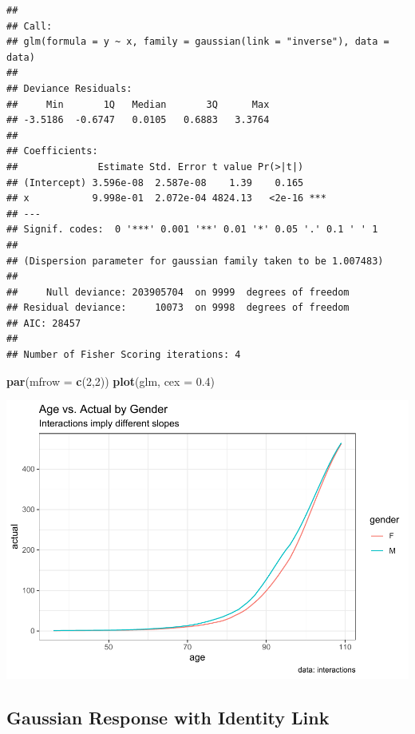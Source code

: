 \documentclass[openany]{book}
\newenvironment{Shaded}{\begin{snugshade}}{\end{snugshade}}
\newcommand{\DataTypeTok}[1]{\textcolor[rgb]{0.13,0.29,0.53}{#1}}
\newcommand{\DecValTok}[1]{\textcolor[rgb]{0.00,0.00,0.81}{#1}}
\newcommand{\FloatTok}[1]{\textcolor[rgb]{0.00,0.00,0.81}{#1}}
\newcommand{\KeywordTok}[1]{\textcolor[rgb]{0.13,0.29,0.53}{\textbf{#1}}}
\newcommand{\NormalTok}[1]{#1}
\begin{document}
\begin{verbatim}
## 
## Call:
## glm(formula = y ~ x, family = gaussian(link = "inverse"), data = data)
## 
## Deviance Residuals: 
##     Min       1Q   Median       3Q      Max  
## -3.5186  -0.6747   0.0105   0.6883   3.3764  
## 
## Coefficients:
##              Estimate Std. Error t value Pr(>|t|)    
## (Intercept) 3.596e-08  2.587e-08    1.39    0.165    
## x           9.998e-01  2.072e-04 4824.13   <2e-16 ***
## ---
## Signif. codes:  0 '***' 0.001 '**' 0.01 '*' 0.05 '.' 0.1 ' ' 1
## 
## (Dispersion parameter for gaussian family taken to be 1.007483)
## 
##     Null deviance: 203905704  on 9999  degrees of freedom
## Residual deviance:     10073  on 9998  degrees of freedom
## AIC: 28457
## 
## Number of Fisher Scoring iterations: 4
\end{verbatim}

\begin{Shaded}
\begin{Highlighting}[]
\KeywordTok{par}\NormalTok{(}\DataTypeTok{mfrow =} \KeywordTok{c}\NormalTok{(}\DecValTok{2}\NormalTok{,}\DecValTok{2}\NormalTok{))}
\KeywordTok{plot}\NormalTok{(glm, }\DataTypeTok{cex =} \FloatTok{0.4}\NormalTok{)}
\end{Highlighting}
\end{Shaded}

\includegraphics{05-linear-models_files/figure-latex/unnamed-chunk-23-1.pdf}

\hypertarget{gaussian-response-with-identity-link}{%
\subsection{Gaussian Response with Identity Link}\label{gaussian-response-with-identity-link}}
\end{document}
